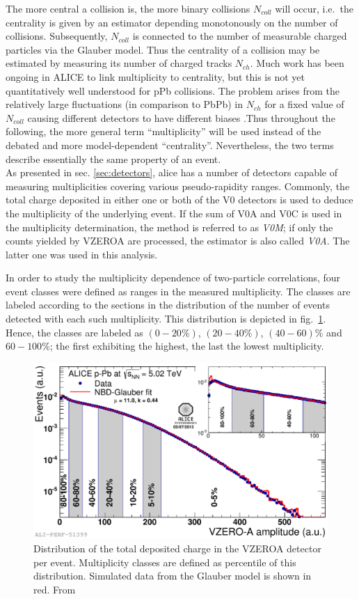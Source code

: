 The more central a collision is, the more binary collisions $N_{coll}$ will occur, i.e.\ the centrality is given by an estimator depending monotonously on the number of collisions. Subsequently, $N_{coll}$ is connected to the number of measurable charged particles via the Glauber model\cite{Vislavicius2013}. Thus the centrality of a collision may be estimated by measuring its number of charged tracks $N_{ch}$. Much work has been ongoing in ALICE to link multiplicity to centrality, but this is not yet quantitatively well understood for \gls{pPb} collisions. The problem arises from the relatively large fluctuations (in comparison to \gls{PbPb}) in $N_{ch}$ for a fixed value of $N_{coll}$ causing different detectors to have different biases \cite{Morsch2013}.Thus throughout the following, the more general term ``multiplicity'' will be used instead of the debated and more model-dependent ``centrality''. Nevertheless, the two terms describe essentially the same property of an event.\\

As presented in sec. \ref{sec:detectors}, \gls{alice} has a number of detectors capable of measuring multiplicities covering various pseudo-rapidity ranges. Commonly, the total charge deposited in either one or both of the V0 detectors is used to deduce the multiplicity of the underlying event. If the sum of  V0A and V0C is used in the multiplicity determination, the method is referred to as \emph{V0M}; if only the counts yielded by VZEROA are processed, the estimator is also called \emph{V0A}. The latter one was used in this analysis.


In order to study the multiplicity dependence of two-particle correlations, four event classes were defined as ranges in the measured multiplicity. The classes are labeled according to the sections in the distribution of the number of events detected with each such multiplicity. This distribution is depicted in fig.~\ref{fig:V0A_dist}. Hence, the classes are labeled as $(0-20\%)$, $(20-40\%)$, $(40-60)\%$ and $60-100\%$; the first exhibiting the highest, the last the lowest multiplicity. 

\begin{figure}
  \centering
  \includegraphics[width=.8\textwidth]{figures/cent_V0A.pdf}
  \caption[Distribution of the total deposited charge in the VZEROA detector per event.]{Distribution of the total deposited charge in the VZEROA detector per event. Multiplicity classes are defined as percentile of this distribution. Simulated data from the Glauber model is shown in red. From \cite{V0Acent2013}}
  \label{fig:V0A_dist}
\end{figure}

